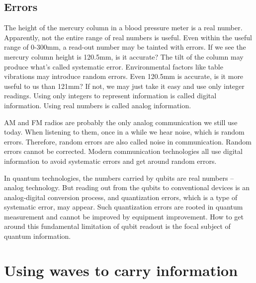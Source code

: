 \documentclass[oneside, letter, 12pt]{book}
\begin{document}
\subsection{Errors}
The height of the mercury column in a blood pressure meter is a real number. Apparently, not the entire range of real numbers is useful. Even within the useful range of 0-300mm, a read-out number may be tainted with errors. If we see the mercury column height is 120.5mm, is it accurate? The tilt of the column may produce what's called systematic error. Environmental factors like table vibrations may introduce random errors. Even 120.5mm is accurate, is it more useful to us than 121mm? If not, we may just take it easy and use only integer readings. Using only integers to represent information is called digital information. Using real numbers is called analog information.

AM and FM radios are probably the only analog communication we still use today. When listening to them, once in a while we hear noise, which is random errors. Therefore, random errors are also called noise in communication. Random errors cannot be corrected. Modern communication technologies all use digital information to avoid systematic errors and get around random errors.

In quantum technologies, the numbers carried by qubits are real numbers -- analog technology. But reading out from the qubits to conventional devices is an analog-digital conversion process, and quantization errors, which is a type of systematic error, may appear. Such quantization errors are rooted in quantum measurement and cannot be improved by equipment improvement. How to get around this fundamental limitation of qubit readout is the focal subject of quantum information.


\section{Using waves to carry information}
\end{document}
